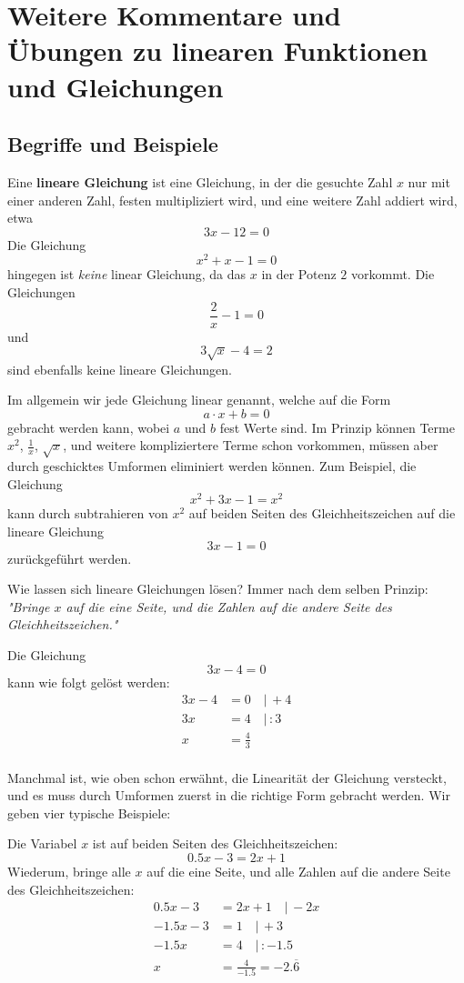 \documentclass[%
11pt,%
twoside,%
titlepage,%
german,%
headsepline%
]{scrartcl}
\begin{document}
\clearpage

\appendix

\section{Weitere Kommentare und Übungen zu linearen Funktionen und Gleichungen}

\subsection{Begriffe und Beispiele}

Eine \textbf{lineare Gleichung} ist eine Gleichung, in der die gesuchte Zahl $x$ nur mit einer anderen Zahl, festen multipliziert wird, und eine weitere Zahl addiert wird, etwa $$3x-12=0$$ Die Gleichung $$x^2+x-1=0$$ hingegen ist \emph{keine} linear Gleichung, da das $x$ in der Potenz $2$ vorkommt. Die Gleichungen $$\frac{2}{x}-1=0$$ und $$3\sqrt{x}-4=2$$ sind ebenfalls keine lineare Gleichungen.

Im allgemein wir jede Gleichung linear genannt, welche auf die Form $$\boxed{a\cdot x + b = 0}$$ gebracht werden kann, wobei $a$ und $b$ fest Werte sind. Im Prinzip können Terme $x^2$, $\frac{1}{x}$, $\sqrt{x}$, und weitere kompliziertere Terme schon vorkommen, müssen aber durch geschicktes Umformen eliminiert werden können. Zum Beispiel, die Gleichung $$x^2+3x-1=x^2$$ kann durch subtrahieren von $x^2$ auf beiden Seiten des Gleichheitszeichen auf die lineare Gleichung $$3x-1=0$$ zurückgeführt werden.

Wie lassen sich lineare Gleichungen lösen? Immer nach dem selben Prinzip: \emph{"Bringe $x$ auf die eine Seite, und die Zahlen auf die andere Seite des Gleichheitszeichen."} 

\begin{bsp}
Die Gleichung $$3x-4 = 0$$ kann wie folgt gelöst werden:
\begin{align*}
3x -4 & = 0 \quad| \, +4\\
3x & = 4 \quad| \, :3\\
x & ={\frac{4}{3}}\\ 
\end{align*}
\end{bsp}

Manchmal ist, wie oben schon erwähnt, die Linearität der Gleichung versteckt, und es muss durch Umformen zuerst in die richtige Form gebracht werden. Wir geben vier typische Beispiele:

\begin{bsp} Die Variabel $x$ ist auf beiden Seiten des Gleichheitszeichen: $$0.5 x-3 = 2 x+1$$ Wiederum, bringe alle $x$ auf die eine Seite, und alle Zahlen auf die andere Seite des Gleichheitszeichen:
                \begin{align*}
                0.5 x-3 & = 2 x+1 \quad| \, -2x\\
                -1.5 x -3 & = 1 \quad| \, +3\\
                -1.5 x & =4 \quad| \, : -1.5\\
                x & = \frac{4}{-1.5}={-2.\overline{6}}
                \end{align*}
\end{bsp}
\end{document}
